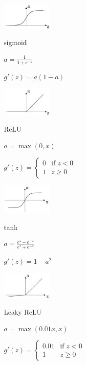 \begin{multicols}{2}
\begin{centering}

\includegraphics[width=2.5cm]{images/sigmoid.png}

sigmoid

$a = \frac{1}{1 + e^{-z}}$

$g'(z) = a(1-a)$

\includegraphics[width=2.5cm]{images/relu.png}

ReLU

$a =  \max (0, x)$

$g'(z) = \begin{cases} 0 & \mbox{if } z < 0 \\ 1 & z \geq 0 \end{cases}$

\includegraphics[width=2.5cm]{images/tanh.png}

tanh

$a = \frac{e^z - e^{-z}}{e^z + e^{-z}}$

$g'(z) = 1-a^2$

\includegraphics[width=2.5cm]{images/leaky_relu.png}

Leaky ReLU

$a =  \max (0.01x, x)$

$g'(z) = \begin{cases} 0.01 & \mbox{if } z < 0 \\ 1 & z \geq 0 \end{cases}$

\end{centering}
\end{multicols}

\vspace{0.1cm}

